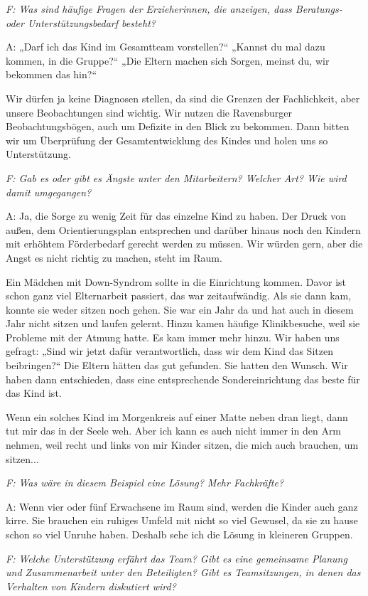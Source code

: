 \emph{F: Was sind häufige Fragen der Erzieherinnen, die anzeigen, dass Beratungs- oder Unterstützungsbedarf besteht?}

A: „Darf ich das Kind im Gesamtteam vorstellen?“ „Kannst du mal dazu kommen, in die Gruppe?“ „Die Eltern machen sich Sorgen, meinst du, wir bekommen das hin?“

Wir dürfen ja keine Diagnosen stellen, da sind die Grenzen der Fachlichkeit, aber unsere Beobachtungen sind wichtig. Wir nutzen die Ravensburger Beobachtungsbögen, auch um Defizite in den Blick zu bekommen. Dann bitten wir um Überprüfung der Gesamtentwicklung des Kindes und holen uns so Unterstützung. 

\emph{F: Gab es oder gibt es Ängste unter den Mitarbeitern? Welcher Art? Wie wird damit umgegangen?}

A: Ja, die Sorge zu wenig Zeit für das einzelne Kind zu haben. Der Druck von außen, dem Orientierungsplan entsprechen und darüber hinaus noch den Kindern mit erhöhtem Förderbedarf gerecht werden zu müssen.
Wir würden gern, aber die Angst es nicht richtig zu machen, steht im Raum. 

Ein Mädchen mit Down-Syndrom sollte in die Einrichtung kommen. Davor ist schon ganz viel Elternarbeit passiert, das war zeitaufwändig. Als sie dann kam, konnte sie weder sitzen noch gehen. Sie war ein Jahr da und hat auch in diesem Jahr nicht sitzen und laufen gelernt. Hinzu kamen häufige Klinikbesuche, weil sie Probleme mit der Atmung hatte. Es kam immer mehr hinzu. Wir haben uns gefragt: „Sind wir jetzt dafür verantwortlich, dass wir dem Kind das Sitzen beibringen?“ Die Eltern hätten das gut gefunden. Sie hatten den Wunsch. Wir haben dann entschieden, dass eine entsprechende Sondereinrichtung das beste für das Kind ist. 

Wenn ein solches Kind im Morgenkreis auf einer Matte neben dran liegt, dann tut mir das in der Seele weh. Aber ich kann es auch nicht immer in den Arm nehmen, weil recht und links von mir Kinder sitzen, die mich auch brauchen, um sitzen...

\emph{F: Was wäre in diesem Beispiel eine Lösung? Mehr Fachkräfte?}

A: Wenn vier oder fünf Erwachsene im Raum sind, werden die Kinder auch ganz kirre. Sie brauchen ein ruhiges Umfeld mit nicht so viel Gewusel, da sie zu hause schon so viel Unruhe haben. Deshalb sehe ich die Lösung in kleineren Gruppen. 

\emph{F: Welche Unterstützung erfährt das Team? 
Gibt es eine gemeinsame Planung und Zusammenarbeit unter den Beteiligten? Gibt es Teamsitzungen, in denen das Verhalten von Kindern diskutiert wird?}
 
